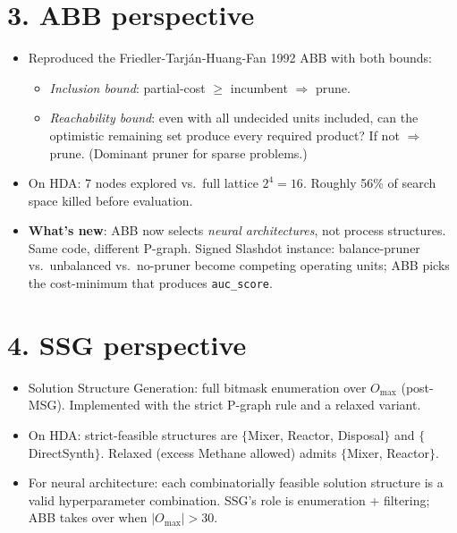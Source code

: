 \documentclass[11pt,a4paper]{article}
\newcommand{\code}[1]{\texttt{\small #1}}
\begin{document}
\section*{3. ABB perspective}

\begin{itemize}
\item Reproduced the Friedler-Tarj\'an-Huang-Fan 1992 ABB with both
      bounds:
      \begin{itemize}
      \item \emph{Inclusion bound}: partial-cost $\geq$ incumbent
            $\Rightarrow$ prune.
      \item \emph{Reachability bound}: even with all undecided units
            included, can the optimistic remaining set produce every
            required product? If not $\Rightarrow$ prune. (Dominant
            pruner for sparse problems.)
      \end{itemize}
\item On HDA: 7 nodes explored vs.\ full lattice $2^4 = 16$. Roughly
      56\% of search space killed before evaluation.
\item \textbf{What's new}: ABB now selects \emph{neural architectures},
      not process structures. Same code, different P-graph. Signed
      Slashdot instance: balance-pruner vs.\ unbalanced vs.\ no-pruner
      become competing operating units; ABB picks the cost-minimum
      that produces \code{auc\_score}.
\end{itemize}

\section*{4. SSG perspective}

\begin{itemize}
\item Solution Structure Generation: full bitmask enumeration over
      $O_{\max}$ (post-MSG). Implemented with the strict P-graph rule
      and a relaxed variant.
\item On HDA: strict-feasible structures are
      $\{$Mixer, Reactor, Disposal$\}$ and $\{$DirectSynth$\}$.
      Relaxed (excess Methane allowed) admits $\{$Mixer, Reactor$\}$.
\item For neural architecture: each combinatorially feasible
      solution structure is a valid hyperparameter combination.
      SSG's role is enumeration + filtering; ABB takes over when
      $|O_{\max}| > 30$.
\end{itemize}
\end{document}
